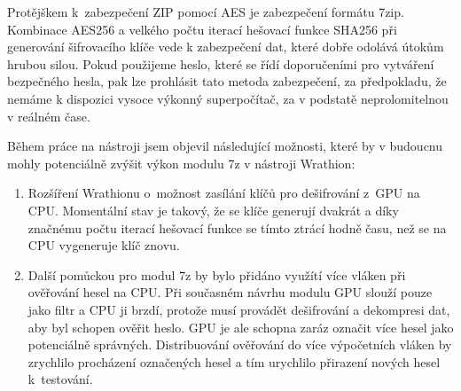 Protějškem k~zabezpečení ZIP pomocí AES je zabezpečení formátu 7zip. Kombinace AES256 a velkého
počtu iterací hešovací funkce SHA256 při generování šifrovacího klíče vede k zabezpečení dat, které
dobře odolává útokům hrubou silou. Pokud použijeme heslo, které se řídí doporučeními pro vytváření
bezpečného hesla, pak lze prohlásit tato metoda zabezpečení, za předpokladu, že nemáme k dispozici
vysoce výkonný superpočítač, za v podstatě neprolomitelnou v reálném čase.

Během práce na nástroji jsem objevil následující možnosti, které by v budoucnu mohly potenciálně
zvýšit výkon modulu 7z v nástroji Wrathion:
\begin{enumerate}
   \item Rozšíření Wrathionu o~možnost zasílání klíčů pro dešifrování z~GPU na CPU. Momentální
       stav je takový, že se klíče generují dvakrát a díky značnému počtu iterací hešovací funkce
       se tímto ztrácí hodně času, než se na CPU vygeneruje klíč znovu.
    \item Další pomůckou pro modul 7z by bylo přidáno využítí více vláken při ověřování hesel na
	CPU. Při současném návrhu modulu GPU slouží pouze jako filtr a CPU ji brzdí, protože musí
	provádět dešifrování a dekompresi dat, aby byl schopen ověřit heslo. GPU je ale schopna
	zaráz označit více hesel jako potenciálně správných. Distribuování ověřování do
	více výpočetních vláken by zrychlilo procházení označených hesel a tím urychlilo
	přirazení nových hesel k~testování.
\end{enumerate}


